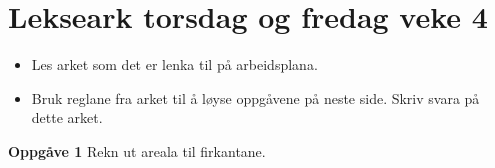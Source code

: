 


\section*{Lekseark torsdag og fredag veke 4}
\begin{itemize}
	\item Les arket som det er lenka til på arbeidsplana.
	\item Bruk reglane fra arket til å løyse oppgåvene på neste side. Skriv svara på dette arket.
\end{itemize}
\newpage

\textbf{Oppgåve 1} \os
Rekn ut areala til firkantane.	
\begin{figure}
	\qquad
{}\qquad
{}
\end{figure}\vsk


